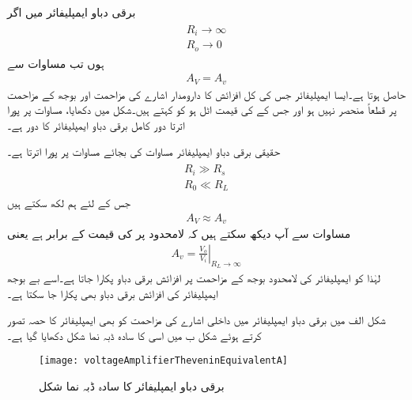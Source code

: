 برقی دباو ایمپلیفائر میں اگر 
\begin{gather} \label{مساوات_قامل_واپسی_دباو_ایمپلیفائر_کے_مزاحمت}
\begin{aligned}
R_i \to \infty \\
R_o \to 0
\end{aligned}
\end{gather}
ہوں تب مساوات   سے
\begin{align} \label{مساوات_واپسی_کامل_دباو_ایمپلیفائر_کی_افزائش}
A_V = A_v
\end{align}
حاصل ہوتا ہے۔ایسا ایمپلیفائر جس کی کل افزائش  کا دارومدار اشارے کی مزاحمت  اور بوجھ کے مزاحمت  پر قطعاً منحصر نہیں ہو اور جس کے   کی قیمت اٹل ہو کو  کہتے ہیں۔شکل  میں دکھایا، مساوات  پر پورا اترتا دور کامل برقی دباو ایمپلیفائر کا دور ہے۔ 

 حقیقی برقی دباو ایمپلیفائر مساوات  کی بجائے مساوات  پر پورا اترتا ہے۔
\begin{gather} \label{مساوات_حقیقی_واپسی_دباو_ایمپلیفائر_کے_مزاحمت}
\begin{aligned}
R_i \gg R_s \\
R_0 \ll R_L
\end{aligned}
\end{gather}
جس کے لئے ہم لکھ سکتے ہیں
\begin{align}  \label{مساوات_واپسی_حقیقی_دباو_ایمپلیفائر_کی_افزائش}
A_V \approx A_v
\end{align}
مساوات  سے آپ دیکھ سکتے ہیں کہ لامحدود  پر  کی قیمت  کے برابر ہے یعنی
\begin{align}
A_v = \left . \frac{V_o}{V_i} \right |_{R_L \to \infty}
\end{align} 
لہٰذا  کو ایمپلیفائر کی لامحدود بوجھ کے مزاحمت پر افزائش برقی دباو پکارا جاتا ہے۔اسے بے بوجھ ایمپلیفائر کی افزائش برقی دباو  بھی پکارا جا سکتا ہے۔

 
شکل  الف میں برقی دباو ایمپلیفائر میں داخلی اشارے کی مزاحمت  کو بھی ایمپلیفائر کا حصہ تصور کرتے ہوئے شکل  ب میں اسی کا سادہ ڈبہ نما شکل دکھایا گیا ہے۔
\begin{figure}
\centering
\texttt{[image: voltageAmplifierTheveninEquivalentA]}
\caption{برقی دباو ایمپلیفائر کا سادہ ڈبہ نما شکل}
\label{شکل_واپسی_دباو_ایمپلیفائر_ڈبہ_شکل}
\end{figure}


